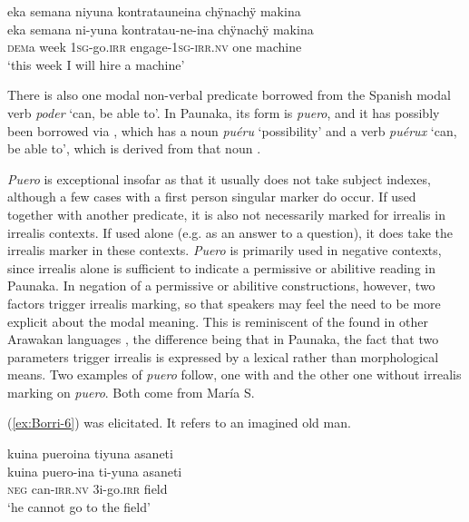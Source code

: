 \ea\label{ex:PTCP-OBJ}
\begingl 
\glpreamble eka semana niyuna kontratauneina chÿnachÿ makina\\
\gla eka semana ni-yuna kontratau-ne-ina chÿnachÿ makina\\ 
\glb \textsc{dem}a week 1\textsc{sg}-go.\textsc{irr} engage-1\textsc{sg}-\textsc{irr.nv} one machine\\ 
\glft ‘this week I will hire a machine’
\trailingcitation{[jxx-p120515l-2.106]}
\xe


\hspace*{-2pt}There is also one modal non-verbal predicate borrowed from the Spanish modal verb \textit{poder} ‘can, be able to’. In Paunaka, its form is \textit{puero}, and it has possibly been borrowed via , which has a noun \textit{puéru} ‘possibility’ and a verb \textit{puérux} ‘can, be able to’, which is derived from that noun \citep[cf.][]{Sans2011}.

\textit{Puero} is exceptional insofar as that it usually does not take subject indexes, although a few cases with a first person singular marker do occur. If used together with another predicate, it is also not necessarily marked for irrealis in irrealis contexts. If used alone (e.g. as an answer to a question), it does take the irrealis marker in these contexts. \textit{Puero} is primarily used in negative contexts, since irrealis alone is sufficient to indicate a permissive or abilitive reading in Paunaka. In negation of a permissive or abilitive constructions, however, two factors trigger irrealis marking, so that speakers may feel the need to be more explicit about the modal meaning. This is reminiscent of the  found in other Arawakan languages \citep[cf.][271]{Michael2014}, the difference being that in Paunaka, the fact that two parameters trigger irrealis is expressed by a lexical rather than morphological means. Two examples of \textit{puero} follow, one with and the other one without irrealis marking on \textit{puero}. Both come from María S.

(\ref{ex:Borri-6}) was elicitated. It refers to an imagined old man.

\ea\label{ex:Borri-6}
\begingl
\glpreamble kuina pueroina tiyuna asaneti\\
\gla kuina puero-ina ti-yuna asaneti\\
\glb \textsc{neg} can-\textsc{irr.nv} 3i-go.\textsc{irr} field\\
\glft ‘he cannot go to the field’
\endgl
\trailingcitation{[rxx-e181022le]}
\xe

